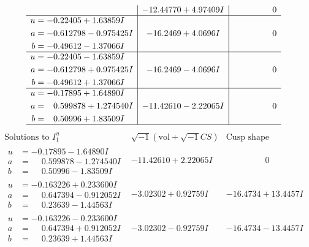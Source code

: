 \documentclass[1p]{elsarticle_modified}
\theoremstyle{definition}
\newcommand{\I}{\sqrt{-1}}
\begin{document}
$$\begin{array}{c|c|c}
 & -12.44770 + 4.97409 I & \phantom{-0.000000 } 0 \\ \hline\begin{aligned}
u &= -0.22405 + 1.63859 I \\
a &= -0.612798 - 0.975425 I \\
b &= -0.49612 - 1.37066 I\end{aligned}
 & -16.2469 + 4.0696 I & \phantom{-0.000000 } 0 \\ \hline\begin{aligned}
u &= -0.22405 - 1.63859 I \\
a &= -0.612798 + 0.975425 I \\
b &= -0.49612 + 1.37066 I\end{aligned}
 & -16.2469 - 4.0696 I & \phantom{-0.000000 } 0 \\ \hline\begin{aligned}
u &= -0.17895 + 1.64890 I \\
a &= \phantom{-}0.599878 + 1.274540 I \\
b &= \phantom{-}0.50996 + 1.83509 I\end{aligned}
 & -11.42610 - 2.22065 I & \phantom{-0.000000 } 0\\
 \hline 
 \end{array}$$\newpage$$\begin{array}{c|c|c}  
\text{Solutions to }I^u_{1}& \I (\text{vol} + \sqrt{-1}CS) & \text{Cusp shape}\\
 \hline 
\begin{aligned}
u &= -0.17895 - 1.64890 I \\
a &= \phantom{-}0.599878 - 1.274540 I \\
b &= \phantom{-}0.50996 - 1.83509 I\end{aligned}
 & -11.42610 + 2.22065 I & \phantom{-0.000000 } 0 \\ \hline\begin{aligned}
u &= -0.163226 + 0.233600 I \\
a &= \phantom{-}0.647394 - 0.912052 I \\
b &= \phantom{-}0.23639 - 1.44563 I\end{aligned}
 & -3.02302 + 0.92759 I & -16.4734 + 13.4457 I \\ \hline\begin{aligned}
u &= -0.163226 - 0.233600 I \\
a &= \phantom{-}0.647394 + 0.912052 I \\
b &= \phantom{-}0.23639 + 1.44563 I\end{aligned}
 & -3.02302 - 0.92759 I & -16.4734 - 13.4457 I \\ \hline\begin{aligned}

\end{aligned}
\end{array}$$
\end{document}
